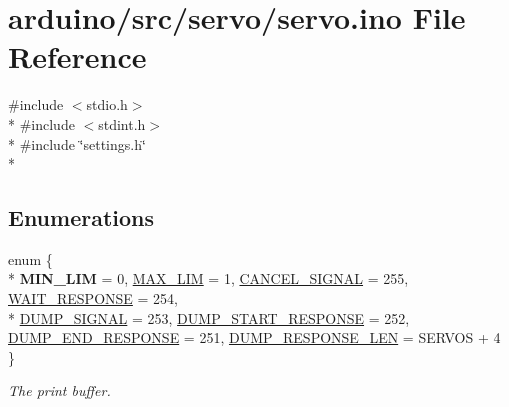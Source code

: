 \hypertarget{servo_8ino}{}\section{arduino/src/servo/servo.ino File Reference}
\label{servo_8ino}
{\ttfamily \#include $<$stdio.\+h$>$}\\*
{\ttfamily \#include $<$stdint.\+h$>$}\\*
{\ttfamily \#include \char`\"{}settings.\+h\char`\"{}}\\*
\subsection*{Enumerations}
\begin{DoxyCompactItemize}
\item 
enum \{ \\*
{\bfseries M\+I\+N\+\_\+\+L\+I\+M} = 0, 
\hyperlink{servo_8ino_a99fb83031ce9923c84392b4e92f956b5a28384d7634c7976556d681b53a81e140}{M\+A\+X\+\_\+\+L\+I\+M} = 1, 
\hyperlink{servo_8ino_a99fb83031ce9923c84392b4e92f956b5ac997ff2715ad695454398a53eeed31cc}{C\+A\+N\+C\+E\+L\+\_\+\+S\+I\+G\+N\+A\+L} = 255, 
\hyperlink{servo_8ino_a99fb83031ce9923c84392b4e92f956b5ac22157b3832ba05308923fb860925d68}{W\+A\+I\+T\+\_\+\+R\+E\+S\+P\+O\+N\+S\+E} = 254, 
\\*
\hyperlink{servo_8ino_a99fb83031ce9923c84392b4e92f956b5a31cd671c80d04a4acc2d8256ec960c90}{D\+U\+M\+P\+\_\+\+S\+I\+G\+N\+A\+L} = 253, 
\hyperlink{servo_8ino_a99fb83031ce9923c84392b4e92f956b5a51975080564db9aa29bff29cce328b5f}{D\+U\+M\+P\+\_\+\+S\+T\+A\+R\+T\+\_\+\+R\+E\+S\+P\+O\+N\+S\+E} = 252, 
\hyperlink{servo_8ino_a99fb83031ce9923c84392b4e92f956b5aa7ca295335eb71b345d3b0bd0e53277e}{D\+U\+M\+P\+\_\+\+E\+N\+D\+\_\+\+R\+E\+S\+P\+O\+N\+S\+E} = 251, 
\hyperlink{servo_8ino_a99fb83031ce9923c84392b4e92f956b5aebe1616f434c26e10f088aebf559d708}{D\+U\+M\+P\+\_\+\+R\+E\+S\+P\+O\+N\+S\+E\+\_\+\+L\+E\+N} = S\+E\+R\+V\+O\+S + 4
 \}
\begin{DoxyCompactList}\small\item\em The print buffer. \end{DoxyCompactList}\end{DoxyCompactItemize}

